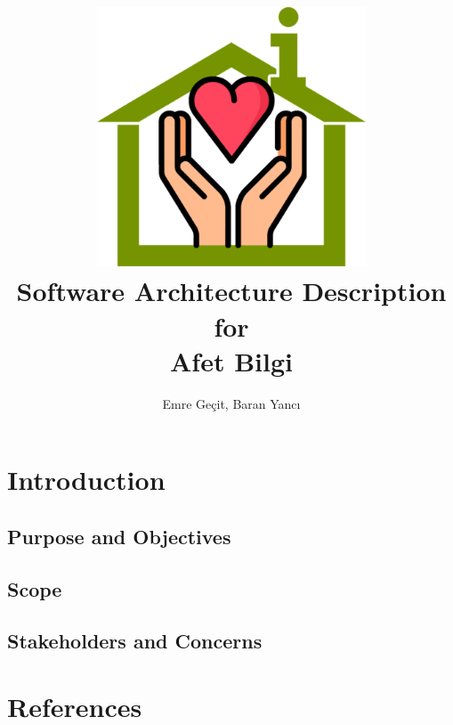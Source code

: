 \documentclass[a4paper]{article}
\author{Emre Geçit, Baran Yancı}
\begin{document}
    \title{\includegraphics[width=0.6\textwidth]{assets/favicon.png}\\ Software Architecture Description for \\  \textbf{Afet Bilgi}}
    \maketitle

    \newpage
    \makeatletter
	\renewcommand\tableofcontents{%
		\null\hfill\textbf{\Large\contentsname}\hfill\null\par
		\@mkboth{\MakeUppercase\contentsname}{\MakeUppercase\contentsname}%
	}
	\makeatother

    \tableofcontents
    \listoffigures
    \listoftables
    \doublespacing

    \newpage

    \section{Introduction}
    \subsection{Purpose and Objectives}
    \lipsum[1-1]
    \subsection{Scope}
    \lipsum[1-1]
    \subsection{Stakeholders and Concerns}
    \lipsum[1-1]

    \section{References}
    \lipsum[1-1]
\end{document}
